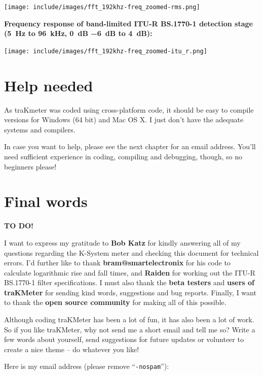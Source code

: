 \begin{center}
  \texttt{[image: include/images/fft\_192khz-freq\_zoomed-rms.png]}
\end{center}

\textbf{Frequency response of band-limited ITU-R BS.1770-1 detection stage
  (\SI{5}{\hertz} to \SI{96}{\kilo\hertz}, \SI{0}{\dB} \SI{-6}{\dB} to
  \SI{4}{\dB}):}

\begin{center}
  \texttt{[image: include/images/fft\_192khz-freq\_zoomed-itu\_r.png]}
\end{center}

\chapter{Help needed}
\label{chap:help_needed}

As traKmeter was coded using cross-platform code, it should be easy to
compile versions for Windows (\num{64} bit) and Mac OS X.  I just
don’t have the adequate systems and compilers.

In case you want to help, please see the next chapter for an email
address.  You’ll need sufficient experience in coding, compiling and
debugging, though, so no beginners please!

\chapter{Final words}
\label{chap:final_words}

\textbf{TO DO!}

I want to express my gratitude to \textbf{Bob Katz} for kindly
answering all of my questions regarding the K-System meter and
checking this document for technical errors.  I'd further like to
thank \textbf{bram@smartelectronix} for his code to calculate
logarithmic rise and fall times, and \textbf{Raiden} for working out
the ITU-R BS.1770-1 filter specifications.  I must also thank the
\textbf{beta testers} and \textbf{users of traKMeter} for sending kind
words, suggestions and bug reports.  Finally, I want to thank the
\textbf{open source community} for making all of this possible.

Although coding traKMeter has been a lot of fun, it has also been a
lot of work.  So if you like traKMeter, why not send me a short email
and tell me so?  Write a few words about yourself, send suggestions
for future updates or volunteer to create a nice theme -- do whatever
you like!

Here is my email address (please remove ``\texttt{-nospam}''):

